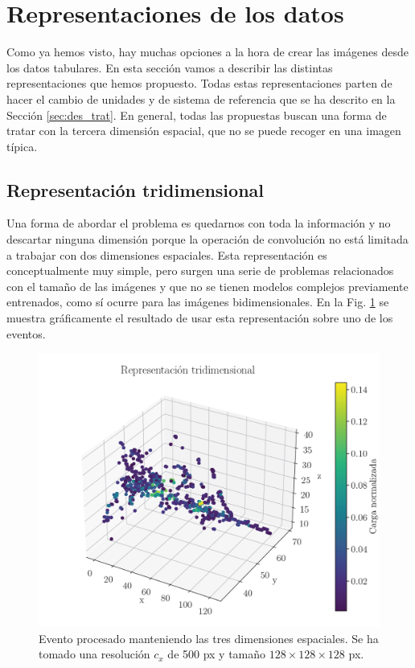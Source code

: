 \documentclass[a4paper,12pt,oneside,titlepage]{book}
\begin{document}
\section{Representaciones de los datos}

Como ya hemos visto, hay muchas opciones a la hora de crear las imágenes desde los datos tabulares. En esta sección vamos a describir las distintas representaciones que hemos propuesto. Todas estas representaciones parten de hacer el cambio de unidades y de sistema de referencia que se ha descrito en la Sección \ref{sec:des_trat}. En general, todas las propuestas buscan una forma de tratar con la tercera dimensión espacial, que no se puede recoger en una imagen típica. 

\subsection*{Representación tridimensional}

Una forma de abordar el problema es quedarnos con toda la información y no descartar ninguna dimensión porque la operación de convolución no está limitada a trabajar con dos dimensiones espaciales. Esta representación es conceptualmente muy simple, pero surgen una serie de problemas relacionados con el tamaño de las imágenes y que no se tienen modelos complejos previamente entrenados, como sí ocurre para las imágenes bidimensionales. En la Fig. \ref{fig:proy_3d} se muestra gráficamente el resultado de usar esta representación sobre uno de los eventos.

\begin{figure}[h!]
  \centering
  \includegraphics[scale=0.85, center]{rep_3d.PNG}
  \caption{Evento procesado manteniendo las tres dimensiones espaciales. Se ha tomado una resolución $c_x$ de 500 px y tamaño $128\times128\times128$ px.}
  \label{fig:proy_3d}
\end{figure}
\end{document}
